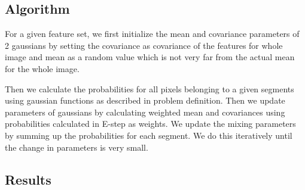 \documentclass{article}
\begin{document}
\subsection{Algorithm}
For a given feature set, we first initialize the mean and covariance parameters of 2 gaussians by setting the covariance as covariance of the features for whole image and mean as a random value which is not very far from the actual mean for the whole image.

Then we calculate the probabilities for all pixels belonging to a given segments using gaussian functions as described in problem definition. Then we update parameters of gaussians by calculating weighted mean and covariances using probabilities calculated in E-step as weights. We update the mixing parameters by summing up the probabilities for each segment. We do this iteratively until the change in parameters is very small.

\subsection{Results}
\end{document}
